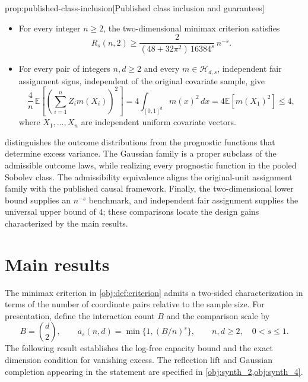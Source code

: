 \documentclass[11pt]{article}
\begin{document}
\begin{propositionv}{prop:published-class-inclusion}[Published class inclusion and guarantees]
\begin{itemize}
\item For every integer \(n\geq2\), the two-dimensional minimax criterion satisfies
\[
R_s(n,2)\geq
\frac{2}{(48+32\pi^2)\,16384^s}\,n^{-s}.
\]

\item For every pair of integers \(n,d\geq2\) and every \(m\in\mathcal H_{d,s}\), independent fair assignment signs, independent of the original covariate sample, give
\[
\frac4n\,\mathbb E\!\left[
\left(\sum_{i=1}^n Z_i m(X_i)\right)^2
\right]
=
4\int_{[0,1]^d}m(x)^2\,dx
=
4\mathbb E[m(X_1)^2]
\leq4,
\]
where \(X_1,\ldots,X_n\) are independent uniform covariate vectors.
\end{itemize}
\end{propositionv}

 distinguishes the outcome distributions from the prognostic functions that determine excess variance. The Gaussian family is a proper subclass of the admissible outcome laws, while realizing every prognostic function in the pooled Sobolev class. The admissibility equivalence aligns the original-unit assignment family with the published causal framework. Finally, the two-dimensional lower bound supplies an \(n^{-s}\) benchmark, and independent fair assignment supplies the universal upper bound of \(4\); these comparisons locate the design gains characterized by the main results.


\section{Main results}

The minimax criterion in \cref{obj:def:criterion} admits a two-sided characterization in terms of the number of coordinate pairs relative to the sample size. For presentation, define the interaction count \(B\) and the comparison scale  by
\[
B=\binom d2,
\qquad
a_s(n,d)=\min\{1,(B/n)^s\},
\qquad n,d\geq2,\quad 0<s\leq1.
\]
The following result establishes the log-free capacity bound and the exact dimension condition for vanishing excess. The reflection lift and Gaussian completion appearing in the statement are specified in \cref{obj:synth_2,obj:synth_4}.
\end{document}
